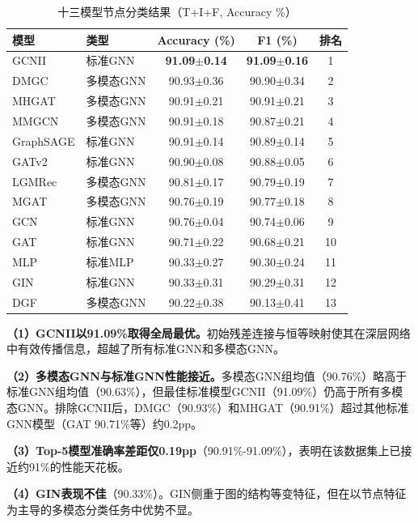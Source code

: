 \begin{table}[htbp]
  \centering
  \caption{十三模型节点分类结果（T+I+F, Accuracy \%）}
  \label{tab:model_comparison}
  \small
  \begin{tabular}{llccc}
    \toprule
    模型 & 类型 & Accuracy (\%) & F1 (\%) & 排名 \\
    \midrule
    GCNII & 标准GNN & \textbf{91.09$\pm$0.14} & \textbf{91.09$\pm$0.16} & 1 \\
    DMGC & 多模态GNN & 90.93$\pm$0.36 & 90.90$\pm$0.34 & 2 \\
    MHGAT & 多模态GNN & 90.91$\pm$0.21 & 90.91$\pm$0.21 & 3 \\
    MMGCN & 多模态GNN & 90.91$\pm$0.18 & 90.87$\pm$0.21 & 4 \\
    GraphSAGE & 标准GNN & 90.91$\pm$0.14 & 90.89$\pm$0.14 & 5 \\
    GATv2 & 标准GNN & 90.90$\pm$0.08 & 90.88$\pm$0.05 & 6 \\
    LGMRec & 多模态GNN & 90.81$\pm$0.17 & 90.79$\pm$0.19 & 7 \\
    MGAT & 多模态GNN & 90.76$\pm$0.19 & 90.77$\pm$0.18 & 8 \\
    GCN & 标准GNN & 90.76$\pm$0.04 & 90.74$\pm$0.06 & 9 \\
    GAT & 标准GNN & 90.71$\pm$0.22 & 90.68$\pm$0.21 & 10 \\
    MLP & 标准MLP & 90.33$\pm$0.27 & 90.30$\pm$0.24 & 11 \\
    GIN & 标准GNN & 90.33$\pm$0.31 & 90.29$\pm$0.31 & 12 \\
    DGF & 多模态GNN & 90.22$\pm$0.38 & 90.13$\pm$0.41 & 13 \\
    \bottomrule
  \end{tabular}
\end{table}

\textbf{（1）GCNII以91.09\%取得全局最优。}初始残差连接与恒等映射使其在深层网络中有效传播信息，超越了所有标准GNN和多模态GNN。

\textbf{（2）多模态GNN与标准GNN性能接近。}多模态GNN组均值（90.76\%）略高于标准GNN组均值（90.63\%），但最佳标准模型GCNII（91.09\%）仍高于所有多模态GNN。排除GCNII后，DMGC（90.93\%）和MHGAT（90.91\%）超过其他标准GNN模型（GAT 90.71\%等）约0.2pp。

\textbf{（3）Top-5模型准确率差距仅0.19pp}（90.91\%-91.09\%），表明在该数据集上已接近约91\%的性能天花板。

\textbf{（4）GIN表现不佳}（90.33\%）。GIN侧重于图的结构等变特征，但在以节点特征为主导的多模态分类任务中优势不显。

